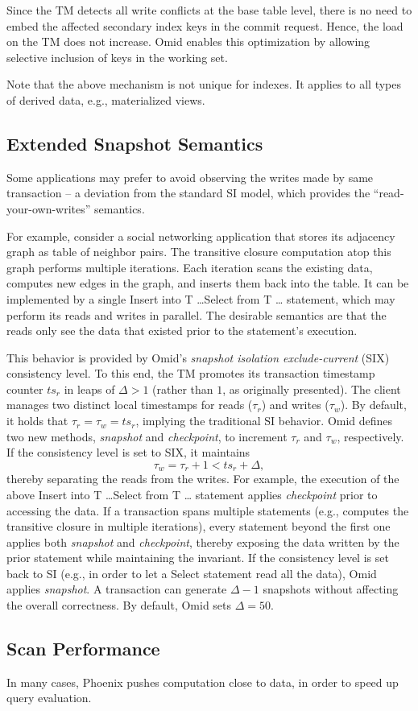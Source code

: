 Since the TM detects all write conflicts at the base table level, there is no need to embed the affected 
secondary index keys in the commit request. Hence, the load on the TM does not increase. Omid 
enables this optimization by allowing selective inclusion of keys in the working set. 

Note that the above mechanism is not unique for indexes. It applies to all types of derived data, 
e.g., materialized views. 

\subsection{Extended Snapshot Semantics}

Some applications may prefer to avoid observing the writes made by same transaction --
a deviation from the standard SI model, which provides the ``read-your-own-writes'' 
semantics. 

For example, consider a social networking application that stores its adjacency graph 
as table of neighbor pairs. The transitive closure computation atop this graph performs
multiple iterations. Each iteration scans the existing data, computes new edges in the 
graph, and inserts them back into the table. It can be implemented by a single 
{\sc Insert into T \ldots Select from T \ldots \/} statement, which may perform its reads and writes in parallel. 
The desirable semantics are that the reads only see the data that existed prior to the 
statement's execution. 

This behavior is provided by Omid's {\em snapshot isolation exclude-current} (SIX) 
consistency level. To this end, the TM promotes its transaction timestamp counter $ts_r$ 
in leaps of $\Delta > 1$ (rather than $1$, as originally presented).  The client manages 
two distinct local timestamps for reads ($\tau_r$) and writes ($\tau_w$). By default, 
it holds that  $\tau_r = \tau_w = ts_r$, implying the traditional SI behavior. Omid 
defines two new methods, {\em snapshot\/} and {\em checkpoint}, to increment 
$\tau_r$ and $\tau_w$, respectively. If the consistency level is set to SIX, 
it maintains 
\[
\tau_w = \tau_r+1 < ts_r+\Delta,
\]
thereby separating the reads from the writes. For example, the execution of 
the above {\sc Insert into T \ldots Select from T \ldots \/} statement applies 
{\em checkpoint\/} prior to accessing the data. If a transaction spans multiple 
statements (e.g., computes the transitive closure in multiple iterations), 
every statement beyond the first one applies both {\em snapshot\/} 
and {\em checkpoint}, thereby exposing the data written by the prior 
statement while maintaining the invariant. If the consistency level is
set back to SI (e.g., in order to let a {\sc Select\/} statement read all 
the data), Omid applies {\em snapshot\/}.  
A transaction can generate $\Delta-1$ snapshots without affecting 
the overall correctness. By default, Omid sets $\Delta=50$.  

\subsection{Scan Performance} In many cases, Phoenix pushes computation close to data, in order
to speed up query evaluation.
